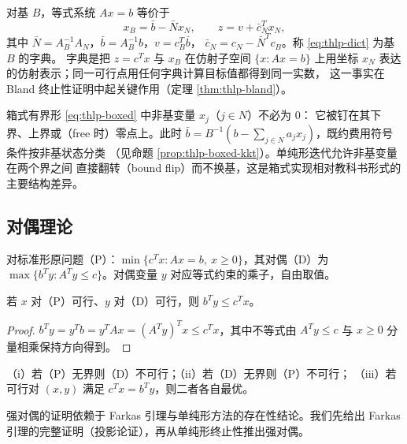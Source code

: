 \begin{definition}[字典]\label{def:thlp-dict}
对基 $B$，等式系统 $Ax=b$ 等价于
\begin{equation}\label{eq:thlp-dict}
  x_B=\bar b-\bar N x_N,\qquad
  z=v+\bar c_N^{T}x_N,
\end{equation}
其中 $\bar N=A_B^{-1}A_N$，$\bar b=A_B^{-1}b$，$v=c_B^{T}\bar b$，
$\bar c_N=c_N-\bar N^{T}c_B$。称 \eqref{eq:thlp-dict} 为基 $B$ 的字典。
字典是把 $z=c^{T}x$ 与 $x_B$ 在仿射子空间 $\{x:Ax=b\}$ 上用坐标
$x_N$ 表达的仿射表示；同一可行点用任何字典计算目标值都得到同一实数，
这一事实在 Bland 终止性证明中起关键作用（定理 \ref{thm:thlp-bland}）。
\end{definition}

\begin{remark}\label{rem:thlp-boxed-nonbasic}
箱式有界形 \eqref{eq:thlp-boxed} 中非基变量 $x_j$（$j\in N$）不必为 $0$：
它被钉在其下界、上界或（free 时）零点上。此时
$\bar b=B^{-1}(b-\sum_{j\in N}a_j x_j)$，既约费用符号条件按非基状态分类
（见命题 \ref{prop:thlp-boxed-kkt}）。单纯形迭代允许非基变量在两个界之间
直接翻转（bound flip）而不换基，这是箱式实现相对教科书形式的主要结构差异。
\end{remark}

\subsection{对偶理论}\label{subsec:thlp-duality}

对标准形原问题（P）：$\min\{c^{T}x:Ax=b,\ x\ge0\}$，其对偶（D）为
$\max\{b^{T}y:A^{T}y\le c\}$。对偶变量 $y$ 对应等式约束的乘子，自由取值。

\begin{theorem}[弱对偶]\label{thm:thlp-weak}
若 $x$ 对（P）可行、$y$ 对（D）可行，则 $b^{T}y\le c^{T}x$。
\end{theorem}

\begin{proof}
$b^{T}y=y^{T}b=y^{T}Ax=(A^{T}y)^{T}x\le c^{T}x$，其中不等式由
$A^{T}y\le c$ 与 $x\ge0$ 分量相乘保持方向得到。
\end{proof}

\begin{corollary}\label{cor:thlp-weak-conseq}
（i）若（P）无界则（D）不可行；（ii）若（D）无界则（P）不可行；
（iii）若可行对 $(x,y)$ 满足 $c^{T}x=b^{T}y$，则二者各自最优。
\end{corollary}

强对偶的证明依赖于 Farkas 引理与单纯形方法的存在性结论。我们先给出
Farkas 引理的完整证明（投影论证），再从单纯形终止性推出强对偶。

